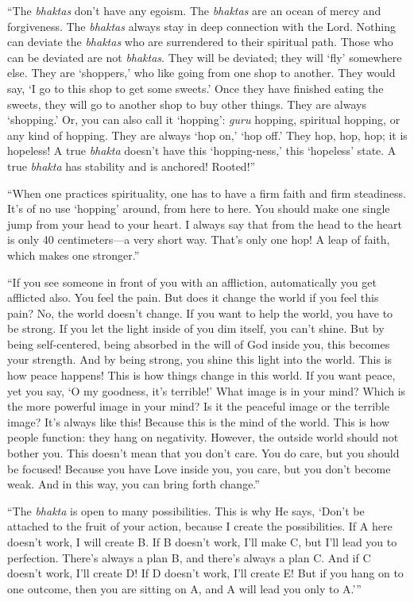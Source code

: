 \enquote{The \textit{bhaktas} don’t have any egoism. The \textit{bhaktas} are an ocean of mercy and forgiveness. The \textit{bhaktas} always stay in deep connection with the Lord. Nothing can deviate the \textit{bhaktas} who are surrendered to their spiritual path. Those who can be deviated are not \textit{bhaktas}. They will be deviated; they will \enquote{fly} somewhere else. They are \enquote{shoppers,} who like going from one shop to another. They would say, \enquote{I go to this shop to get some sweets.} Once they have finished eating the sweets, they will go to another shop to buy other things. They are always \enquote{shopping.} Or, you can also call it \enquote{hopping}: \textit{guru} hopping, spiritual hopping, or any kind of hopping. They are always \enquote{hop on,} \enquote{hop off.} They hop, hop, hop; it is hopeless! A true \textit{bhakta} doesn’t have this \enquote{hopping-ness,} this \enquote{hopeless} state. A true \textit{bhakta} has stability and is anchored! Rooted!}

\enquote{When one practices spirituality, one has to have a firm faith and firm steadiness. It’s of no use \enquote{hopping} around, from here to here. You should make one single jump from your head to your heart. I always say that from the head to the heart is only 40 centimeters---a very short way. That’s only one hop! A leap of faith, which makes one stronger.}

\enquote{If you see someone in front of you with an affliction, automatically you get afflicted also. You feel the pain. But does it change the world if you feel this pain? No, the world doesn’t change. If you want to help the world, you have to be strong. If you let the light inside of you dim itself, you can’t shine. But by being self-centered, being absorbed in the will of God inside you, this becomes your strength. And by being strong, you shine this light into the world. This is how peace happens! This is how things change in this world. If you want peace, yet you say, \enquote{O my goodness, it’s terrible!} What image is in your mind? Which is the more powerful image in your mind? Is it the peaceful image or the terrible image? It’s always like this! Because this is the mind of the world. This is how people function: they hang on negativity. However, the outside world should not bother you. This doesn’t mean that you don’t care. You do care, but you should be focused! Because you have Love inside you, you care, but you don’t become weak. And in this way, you can bring forth change.}

\enquote{The \textit{bhakta} is open to many possibilities. This is why He says, \enquote{Don’t be attached to the fruit of your action, because I create the possibilities. If A here doesn’t work, I will create B. If B doesn’t work, I’ll make C, but I’ll lead you to perfection. There’s always a plan B, and there’s always a plan C. And if C doesn’t work, I’ll create D! If D doesn’t work, I’ll create E! But if you hang on to one outcome, then you are sitting on A, and A will lead you only to A.}}

